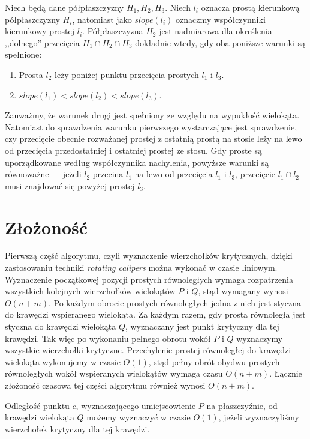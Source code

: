 \begin{lemat}\emph{\cite{Brown78}}
  Niech będą dane półpłaszczyzny $H_1, H_2, H_3$. Niech $l_i$ oznacza
  prostą kierunkową półpłaszczyzny $H_i$, natomiast jako $slope(l_i)$
  oznaczmy współczynniki kierunkowy prostej $l_i$. Półpłaszczyzna
  $H_2$ jest nadmiarowa dla określenia ,,dolnego'' przecięcia $H_1
  \cap H_2 \cap H_3$ dokładnie wtedy, gdy oba poniższe warunki są
  spełnione:

  \begin{enumerate}
    \item Prosta $l_2$ leży poniżej punktu przecięcia prostych $l_1$ i
      $l_3$.
    \item $slope(l_1) < slope(l_2) < slope(l_3)$.
  \end{enumerate}
\end{lemat}

Zauważmy, że warunek drugi jest spełniony ze względu na wypukłość
wielokąta. Natomiast do sprawdzenia warunku pierwszego wystarczające
jest sprawdzenie, czy przecięcie obecnie rozważanej prostej z ostatnią
prostą na stosie leży na lewo od przecięcia przedostatniej i ostatniej
prostej ze stosu. Gdy proste są uporządkowane według współczynnika
nachylenia, powyższe warunki są równoważne --- jeżeli $l_2$ przecina
$l_1$ na lewo od przecięcia $l_1$ i $l_3$, przecięcie $l_1 \cap l_2$
musi znajdować się powyżej prostej $l_3$.

\section{Złożoność}
Pierwszą część algorytmu, czyli wyznaczenie wierzchołków krytycznych,
dzięki zastosowaniu techniki \emph{rotating calipers} można wykonać w
czasie liniowym. Wyznaczenie początkowej pozycji prostych równoległych
wymaga rozpatrzenia wszystkich kolejnych wierzchołków wielokątów $P$ i
$Q$, stąd wymagany wynosi $O(n + m)$. Po każdym obrocie prostych
równoległych jedna z nich jest styczna do krawędzi wspieranego
wielokąta. Za każdym razem, gdy prosta równoległa jest styczna do
krawędzi wielokąta $Q$, wyznaczany jest punkt krytyczny dla tej
krawędzi. Tak więc po wykonaniu pełnego obrotu wokół $P$ i $Q$
wyznaczymy wszystkie wierzchołki krytyczne. Przechylenie prostej
równoległej do krawędzi wielokąta wykonujemy w czasie $O(1)$, stąd
pełny obrót obydwu prostych równoległych wokół wspieranych wielokątów
wymaga czasu $O(n + m)$.  Łącznie złożoność czasowa tej części
algorytmu również wynosi $O(n + m)$.

Odległość punktu $c$, wyznaczającego umiejscowienie $P$ na
płaszczyźnie, od krawędzi wielokąta $Q$ możemy wyznaczyć w czasie
$O(1)$, jeżeli wyznaczyliśmy wierzchołek krytyczny dla tej krawędzi.

